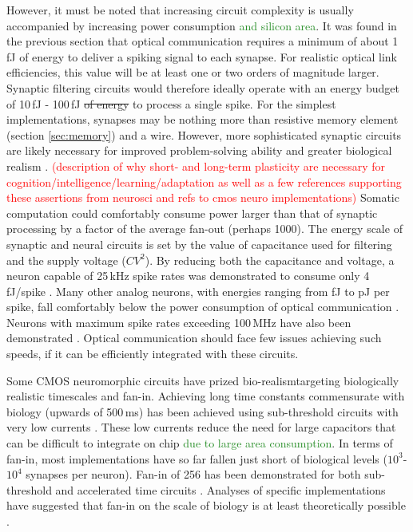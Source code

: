 \documentclass[twocolumn]{article}
\begin{document}
However, it must be noted that increasing circuit complexity is usually accompanied by increasing power consumption \textcolor{ForestGreen}{and silicon area}. It was found in the previous section that optical communication requires a minimum of about 1\,fJ of energy to deliver a spiking signal to each synapse. For realistic optical link efficiencies, this value will be at least one or two orders of magnitude larger. Synaptic filtering circuits would therefore ideally operate with an energy budget of 10\,fJ - 100\,fJ \sout{of energy} to process a single spike. For the simplest implementations, synapses may be nothing more than resistive memory element (section \ref{sec:memory}) and a wire. However, more sophisticated synaptic circuits are likely necessary for improved problem-solving ability and greater biological realism \cite{chicca2020recipe}. \textcolor{red}{(description of why short- and long-term plasticity are necessary for cognition/intelligence/learning/adaptation as well as a few references supporting these assertions from neurosci and refs to cmos neuro implementations)} Somatic computation could comfortably consume power larger than that of synaptic processing by a factor of the average fan-out (perhaps 1000). The energy scale of synaptic and neural circuits is set by the value of capacitance used for filtering and the supply voltage ($CV^{2}$). By reducing both the capacitance and voltage, a neuron capable of 25\,kHz spike rates was demonstrated to consume only 4\,fJ/spike \cite{sourikopoulos20174}. Many other analog neurons, with energies ranging from fJ to pJ per spike, fall comfortably below the power consumption of optical communication \cite{indiveri2019importance}. Neurons with maximum spike rates exceeding 100\,MHz have also been demonstrated \cite{schemmel2020accelerated}. Optical communication should face few issues achieving such speeds, if it can be efficiently integrated with these circuits.

Some CMOS neuromorphic circuits have prized bio-realism\textemdash targeting biologically realistic timescales and fan-in. Achieving long time constants commensurate with biology (upwards of 500\,ms) has been achieved using sub-threshold circuits with very low currents \cite{indiveri2011neuromorphic}. These low currents reduce the need for large capacitors that can be difficult to integrate on chip \textcolor{ForestGreen}{due to large area consumption}. In terms of fan-in, most implementations have so far fallen just short of biological levels ($10^3$-$10^4$ synapses per neuron). Fan-in of 256 has been demonstrated for both sub-threshold \cite{qiao2015reconfigurable} and accelerated time circuits \cite{schemmel2020accelerated}. Analyses of specific implementations have suggested that fan-in on the scale of biology is at least theoretically possible \cite{dowrick2018fan, akima2014majority}.  
\end{document}
